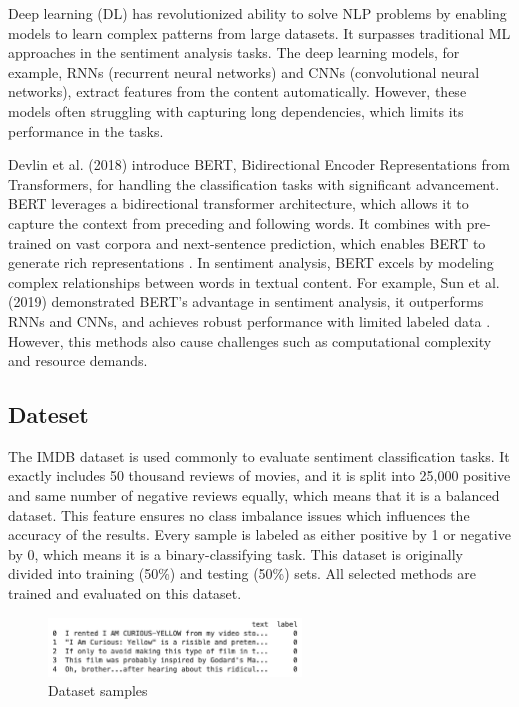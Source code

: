 Deep learning (DL) has revolutionized ability to solve NLP problems by enabling models to learn complex patterns from large datasets. It surpasses traditional ML approaches in the sentiment analysis tasks. The deep learning models, for example, RNNs (recurrent neural networks) and CNNs (convolutional neural networks), extract features from the content automatically. However, these models often struggling with capturing long dependencies, which limits its performance in the tasks. 

Devlin et al. (2018) introduce BERT, Bidirectional Encoder Representations from Transformers, for handling the classification tasks with significant advancement. BERT leverages a bidirectional transformer architecture, which allows it to capture the context from preceding and following words. It combines with pre-trained on vast corpora and next-sentence prediction, which enables BERT to generate rich representations \cite{Devlin2018}. In sentiment analysis, BERT excels by modeling complex relationships between words in textual content. For example, Sun et al. (2019) demonstrated BERT's advantage in sentiment analysis, it outperforms RNNs and CNNs, and achieves robust performance with limited labeled data \cite{Sun2019}. However, this methods also cause challenges such as computational complexity and resource demands.

\subsection{Dateset}
The IMDB dataset is used commonly to evaluate sentiment classification tasks. It exactly includes 50 thousand reviews of movies, and it is split into 25,000 positive and same number of negative reviews equally, which means that it is a balanced dataset. This feature ensures no class imbalance issues which influences the accuracy of the results. Every sample is labeled as either positive by 1 or negative by 0, which means it is a binary-classifying task. This dataset is originally divided into training (50\%) and testing (50\%) sets. All selected methods are trained and evaluated on this dataset.

\begin{figure}[ht]
    \centering
    \includegraphics[width=0.6\textwidth]{pics/data_sample.png}
    \caption{Dataset samples}
\end{figure}

